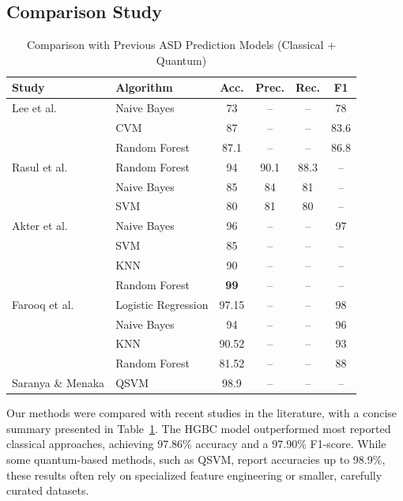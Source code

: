 \documentclass[runningheads]{llncs}
\begin{document}
\subsection{Comparison Study}\label{sec:results}
\begin{table}[ht!]
    \centering
    \caption{Comparison with Previous ASD Prediction Models (Classical + Quantum)}
    \renewcommand{\arraystretch}{1.3}
    \setlength{\tabcolsep}{6pt}
    \begin{tabular}{|p{5.5cm}|p{2.5cm}|c|c|c|c|}
        \hline
            \textbf{Study} & \textbf{Algorithm} & \textbf{Acc.} & \textbf{Prec.} & \textbf{Rec.} & \textbf{F1} \\
            \hline
            Lee et al.\ \cite{lee2020}
            & Naive Bayes     & 73    & --    & --    & 78   \\
            & CVM              & 87    & --    & --    & 83.6 \\
            & Random Forest    & 87.1  & --    & --    & 86.8 \\
            \hline
            Rasul et al.\ \cite{rasul2024}
            & Random Forest    & 94    & 90.1  & 88.3  & --   \\
            & Naive Bayes      & 85    & 84    & 81    & --   \\
            & SVM              & 80    & 81    & 80    & --   \\
            \hline
            Akter et al.\ \cite{akter2019}
            & Naive Bayes      & 96    & --    & --    & 97   \\
            & SVM              & 85    & --    & --    & --   \\
            & KNN              & 90    & --    & --    & --   \\
            & Random Forest    & \textbf{99} & -- & -- & --   \\
            \hline
            Farooq et al.\ \cite{farooq2023}
            & Logistic Regression & 97.15 & -- & -- & 98   \\
            & Naive Bayes         & 94    & -- & -- & 96   \\
            & KNN                 & 90.52 & -- & -- & 93   \\
            & Random Forest       & 81.52 & -- & -- & 88   \\
            \hline
            Saranya \& Menaka \cite{saranya2025}
            & QSVM             & 98.9  & --   & --   & --   \\
            \hline
    \end{tabular}
    \label{tab:Comparative_Studies}
\end{table}
Our methods were compared with recent studies in the literature, with a concise summary presented in Table~\ref{tab:Comparative_Studies}. The HGBC model outperformed most reported classical approaches, achieving 97.86\% accuracy and a 97.90\% F1-score. While some quantum-based methods, such as QSVM, report accuracies up to 98.9\%, these results often rely on specialized feature engineering or smaller, carefully curated datasets.
\end{document}
